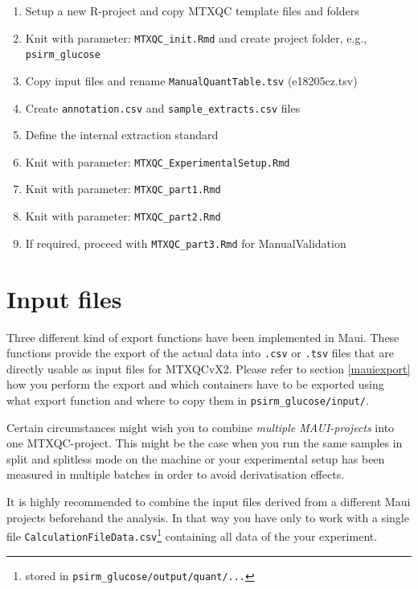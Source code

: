 \documentclass[]{book}
\providecommand{\tightlist}{%
  \setlength{\itemsep}{0pt}\setlength{\parskip}{0pt}}
\let\rmarkdownfootnote\footnote%
\def\footnote{\protect\rmarkdownfootnote}
\begin{document}
\begin{enumerate}
\def\labelenumi{\arabic{enumi}.}
\tightlist
\item
  Setup a new R-project and copy MTXQC template files and folders
\item
  Knit with parameter: \texttt{MTXQC\_init.Rmd} and create project
  folder, e.g., \texttt{psirm\_glucose}
\item
  Copy input files and rename \texttt{ManualQuantTable.tsv}
  (e18205cz.tsv)
\item
  Create \texttt{annotation.csv} and \texttt{sample\_extracts.csv} files
\item
  Define the internal extraction standard
\item
  Knit with parameter: \texttt{MTXQC\_ExperimentalSetup.Rmd}
\item
  Knit with parameter: \texttt{MTXQC\_part1.Rmd}
\item
  Knit with parameter: \texttt{MTXQC\_part2.Rmd}
\item
  If required, proceed with \texttt{MTXQC\_part3.Rmd} for
  ManualValidation
\end{enumerate}

\section{Input files}\label{input-files}

Three different kind of export functions have been implemented in Maui.
These functions provide the export of the actual data into \texttt{.csv}
or \texttt{.tsv} files that are directly usable as input files for
MTXQCvX2. Please refer to section \ref{mauiexport} how you perform the
export and which containers have to be exported using what export
function and where to copy them in \texttt{psirm\_glucose/input/}.

Certain circumstances might wish you to combine \emph{multiple
MAUI-projects} into one MTXQC-project. This might be the case when you
run the same samples in split and splitless mode on the machine or your
experimental setup has been measured in multiple batches in order to
avoid derivatisation effects.

It is highly recommended to combine the input files derived from a
different Maui projects beforehand the analysis. In that way you have
only to work with a single file
\texttt{CalculationFileData.csv}\footnote{stored in
  \texttt{psirm\_glucose/output/quant/...}} containing all data of the
your experiment.
\end{document}
